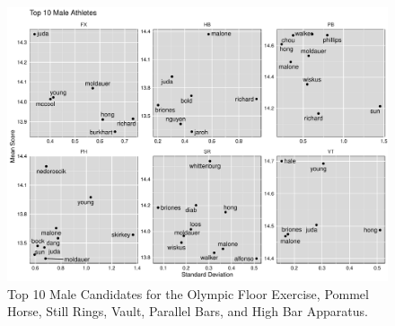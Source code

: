\documentclass[12pt]{article}
\begin{document}
\begin{figure}
  \centering
  \includegraphics[scale=0.5]{FinalMaleApparatusPlot.pdf}
  \caption{Top 10 Male Candidates for the Olympic Floor Exercise, Pommel Horse, Still Rings, Vault, Parallel Bars, 
  and High Bar Apparatus.}
  \label{fig:MA}
\end{figure}
\end{document}
